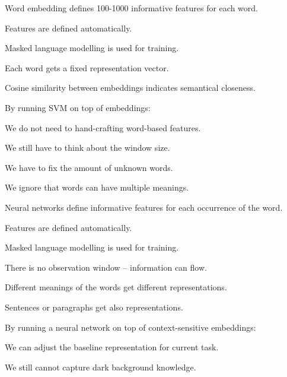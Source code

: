 \documentclass[landscape,footrule]{foils}
\begin{document}

Word embedding defines 100-1000 informative features for each word.
\begin{triangles}
\item Features are defined automatically. 
\item Masked language modelling is used for training.
\item Each word gets a fixed representation vector.
\item Cosine similarity between embeddings indicates semantical closeness.
\end{triangles}
\vspace*{2cm}

By running SVM on top of embeddings: 
\begin{triangles}
\item We do not need to hand-crafting word-based features. 
\item We still have to think about the window size. 
\item We have to fix the amount of unknown words.
\item We ignore that words can have multiple meanings.
\end{triangles}


Neural networks define informative features for each occurrence of the word.

\begin{triangles}
\item Features are defined automatically. 
\item Masked language modelling is used for training.
\item There is no observation window -- information can flow.  
\item Different meanings of the words get different representations.
\item Sentences or paragraphs get also representations.
\end{triangles}
\vspace*{2.5cm}

By running a neural network on top of context-sensitive embeddings: 
\begin{triangles}
\item We can adjust the baseline representation for current task. 
\item We still cannot capture dark background knowledge. 
\end{triangles}
\end{document}
